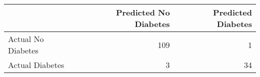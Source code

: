 \begin{tabular}{lrr}
\toprule
 & Predicted No Diabetes & Predicted Diabetes \\
\midrule
Actual No Diabetes & 109 & 1 \\
Actual Diabetes & 3 & 34 \\
\bottomrule
\end{tabular}
